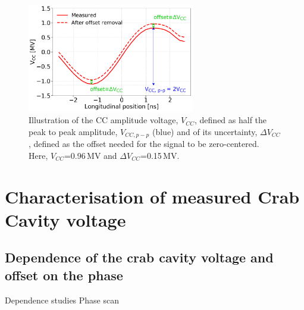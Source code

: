 \begin{figure}[!h]
   \centering         
   \includegraphics[width=0.65\textwidth]{images/Ch4/Vcc_amplitude_uncertainty.pdf}
       \caption{Illustration of the CC amplitude voltage, $V_{CC}$, defined as half the peak to peak amplitude, $V_{CC, p-p}$ (blue) and of its uncertainty, $\Delta V_{CC}$, defined as the offset needed for the signal to be zero-centered. Here, $V_{CC}$=0.96\,MV and $\Delta V_{CC}$=0.15\,MV.}
       \label{fig:VCC_amplitude_and_uncertainty}
   \end{figure}



\section{Characterisation of measured Crab Cavity voltage}\label{sec:CC_voltage_meas}
\subsection{Dependence of the crab cavity voltage and offset on the phase}
Dependence studies 
Phase scan





